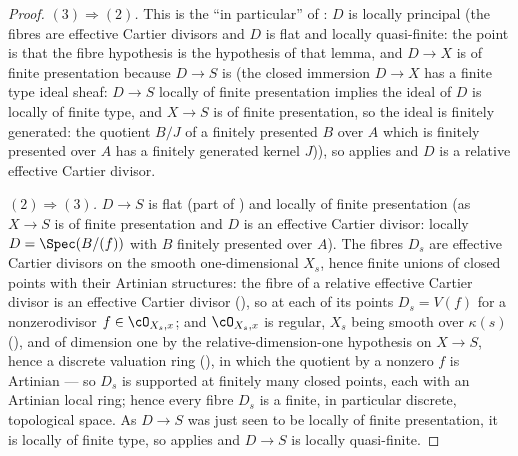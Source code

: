 \begin{proof}
\emph{$(3)\Rightarrow(2)$.}  This is the ``in particular'' of
: $D$ is locally principal (the
fibres are effective Cartier divisors and $D$ is flat and locally
quasi-finite: the point is that the fibre hypothesis is the hypothesis
of that lemma, and $D\to X$ is of finite presentation because
$D\to S$ is (the closed immersion $D\to X$ has a finite type ideal
sheaf: $D\to S$ locally of finite presentation implies the ideal of
$D$ is locally of finite type, and $X\to S$ is of finite presentation,
so the ideal is finitely generated: the quotient $B/J$ of a finitely
presented $B$ over $A$ which is finitely presented over $A$ has a
finitely generated kernel $J$)), so
 applies and $D$ is a relative
effective Cartier divisor.

\emph{$(2)\Rightarrow(3)$.}  $D\to S$ is flat (part of
) and locally of finite
presentation (as $X\to S$ is of finite presentation and $D$ is an
effective Cartier divisor: locally $D=\Spec(B/(f))$ with $B$ finitely
presented over $A$).  The fibres $D_s$ are effective Cartier divisors
on the smooth one-dimensional $X_s$, hence finite unions of closed
points with their Artinian structures: the fibre of a relative effective
Cartier divisor is an effective Cartier divisor
(), so at each of its points
$D_s=V(f)$ for a nonzerodivisor $f\in\cO_{X_s,x}$; and $\cO_{X_s,x}$ is
regular, $X_s$ being smooth over $\kappa(s)$
(), and of dimension one by the
relative-dimension-one hypothesis on $X\to S$, hence a discrete
valuation ring (), in which the quotient
by a nonzero $f$ is Artinian --- so $D_s$ is supported at finitely many
closed points, each with an Artinian local ring; hence every fibre $D_s$ is a
finite, in particular discrete, topological space.  As $D\to S$ was just
seen to be locally of finite presentation, it is locally of finite type,
so  applies and
$D\to S$ is locally quasi-finite.


\end{proof}
